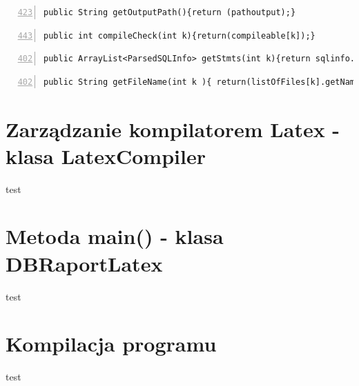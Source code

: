  \begin{lstlisting}[numbers=left,firstnumber=423]
 public String getOutputPath(){return (pathoutput);}
     \end{lstlisting}
     
 \begin{lstlisting}[numbers=left,firstnumber=443]
 public int compileCheck(int k){return(compileable[k]);}
     \end{lstlisting}
     
 \begin{lstlisting}[numbers=left,firstnumber=402]
 public ArrayList<ParsedSQLInfo> getStmts(int k){return sqlinfo.get(k);}
     \end{lstlisting}
     
 \begin{lstlisting}[numbers=left,firstnumber=402]
 public String getFileName(int k ){ return(listOfFiles[k].getName());}
     \end{lstlisting}






\section{Zarządzanie kompilatorem Latex - klasa LatexCompiler}
test
\section{Metoda main() - klasa DBRaportLatex }
test
\section{Kompilacja programu}
test